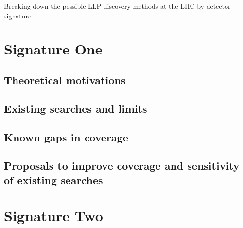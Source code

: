 Breaking down the possible LLP discovery methods at the LHC by detector signature.

\section{Signature One}

\subsection{Theoretical motivations}

\subsection{Existing searches and limits}

\subsection{Known gaps in coverage}

\subsection{Proposals to improve coverage and sensitivity of existing searches}


\section{Signature Two}